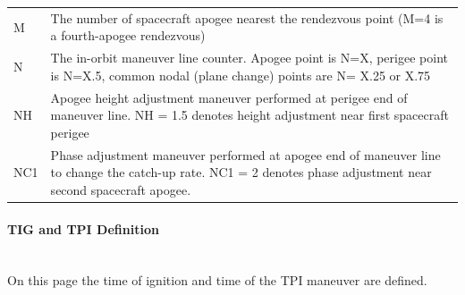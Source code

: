 \documentclass[11pt]{article} %
\begin{document}
\begin{center}
\begin{tabular}{ p{1cm} p{10cm} }
M&The number of spacecraft apogee nearest the rendezvous point (M=4 is a fourth-apogee rendezvous)\\
N&The in-orbit maneuver line counter. Apogee point is N=X, perigee point is N=X.5, common nodal (plane change) points are N= X.25 or X.75\\
NH&Apogee height adjustment maneuver performed at perigee end of maneuver line. NH = 1.5 denotes height adjustment near first spacecraft perigee\\
NC1&Phase adjustment maneuver performed at apogee end of maneuver line to change the catch-up rate. NC1 = 2 denotes phase adjustment near second spacecraft apogee.\\
\end{tabular}
\end{center}

\paragraph{TIG and TPI Definition}\mbox{} \\

On this page the time of ignition and time of the TPI maneuver are defined.
\end{document}
